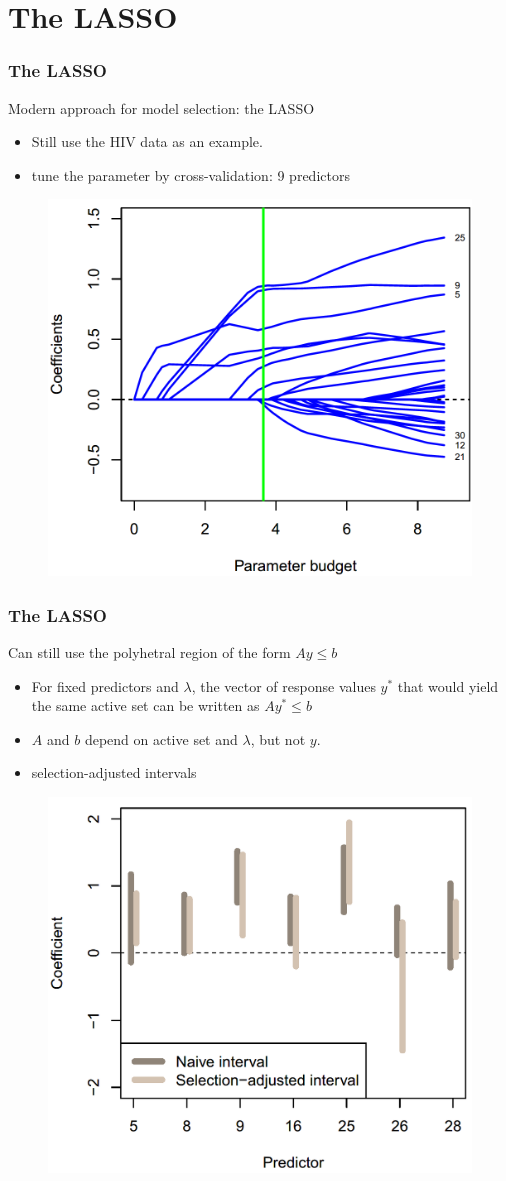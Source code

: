 \documentclass{beamer}
\begin{document}
\section{The LASSO}
\begin{frame}
\frametitle{The LASSO}
Modern approach for model selection: the LASSO
\begin{itemize}
	\item
	Still use the HIV data as an example.
	\item
	tune the parameter by cross-validation: 9 predictors
\end{itemize}
\begin{figure}
	\includegraphics[width=0.6\linewidth]{lasso.png}
\end{figure}
\end{frame}

\begin{frame}
	\frametitle{The LASSO}
	Can still use the polyhetral region of the form $Ay \leq b$
	\begin{itemize}
		\item
		For fixed predictors and $\lambda$, the vector of response values $y^*$ that would yield the same active set can be written as $Ay^*\leq b$
		\item
		$A$ and $b$ depend on active set and $\lambda$, but not $y$.
		\item
		selection-adjusted intervals
	\end{itemize}
	\begin{figure}
		\includegraphics[width=0.5\linewidth]{lasso2.png}
	\end{figure}
\end{frame}
\end{document}
